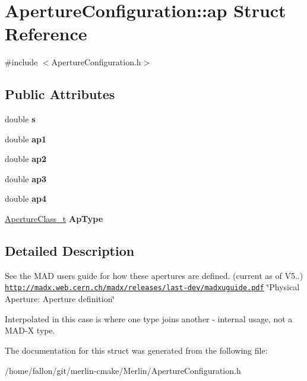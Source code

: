 \hypertarget{structApertureConfiguration_1_1ap}{}\section{Aperture\+Configuration\+:\+:ap Struct Reference}
\label{structApertureConfiguration_1_1ap}


{\ttfamily \#include $<$Aperture\+Configuration.\+h$>$}

\subsection*{Public Attributes}
\begin{DoxyCompactItemize}
\item 
\mbox{\label{structApertureConfiguration_1_1ap_a662b14825383706cfb1548a9af083659}} 
double {\bfseries s}
\item 
\mbox{\label{structApertureConfiguration_1_1ap_adac536334e262f6d77863d37035c580f}} 
double {\bfseries ap1}
\item 
\mbox{\label{structApertureConfiguration_1_1ap_a0307ca82001fedad44736c53cd620291}} 
double {\bfseries ap2}
\item 
\mbox{\label{structApertureConfiguration_1_1ap_a77f2d801233879025e5502434364da89}} 
double {\bfseries ap3}
\item 
\mbox{\label{structApertureConfiguration_1_1ap_ab9d4875c612d163f4583ad2e27c68165}} 
double {\bfseries ap4}
\item 
\mbox{\label{structApertureConfiguration_1_1ap_a86afc7bed14928c846b70d358efc740c}} 
\hyperlink{classApertureConfiguration_a84c9eaffaf4394f1538d2ec57a85c706}{Aperture\+Class\+\_\+t} {\bfseries Ap\+Type}
\end{DoxyCompactItemize}


\subsection{Detailed Description}
See the M\+AD users guide for how these apertures are defined. (current as of V5..) \href{http://madx.web.cern.ch/madx/releases/last-dev/madxuguide.pdf}{\tt http\+://madx.\+web.\+cern.\+ch/madx/releases/last-\/dev/madxuguide.\+pdf} \char`\"{}\+Physical Aperture\+: Aperture definition\char`\"{}

Interpolated in this case is where one type joins another -\/ internal usage, not a M\+A\+D-\/X type. 

The documentation for this struct was generated from the following file\+:\begin{DoxyCompactItemize}
\item 
/home/fallon/git/merlin-\/cmake/\+Merlin/Aperture\+Configuration.\+h\end{DoxyCompactItemize}
